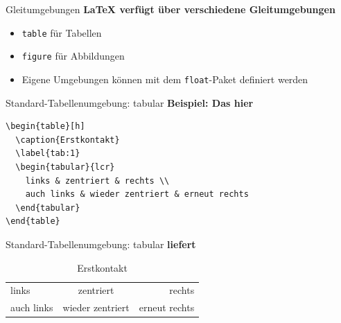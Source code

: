 \documentclass[11pt]{beamer}
\begin{document}
\begin{frame}{Gleitumgebungen}
\textbf{{\LaTeX} verfügt über verschiedene Gleitumgebungen}
\begin{itemize}
\item \texttt{table} für Tabellen
\item \texttt{figure} für Abbildungen
\item Eigene Umgebungen können mit dem \texttt{float}-Paket definiert werden 
\end{itemize}
\end{frame}

{

}

{

}

\begin{frame}[fragile]{Standard-Tabellenumgebung: tabular}
\textbf{Beispiel: Das hier}
\begin{verbatim}
\begin{table}[h]
  \caption{Erstkontakt}
  \label{tab:1}
  \begin{tabular}{lcr}
    links & zentriert & rechts \\
    auch links & wieder zentriert & erneut rechts
  \end{tabular}
\end{table}
\end{verbatim}
\end{frame}

\begin{frame}[fragile]{Standard-Tabellenumgebung: tabular}
\textbf{liefert}
\begin{table}[h]
  \caption{Erstkontakt}
  \label{tab:1}
  \begin{tabular}{lcr}
    links & zentriert & rechts \\
    auch links & wieder zentriert & erneut rechts
  \end{tabular}
\end{table}
\end{frame}

{

}
\end{document}
